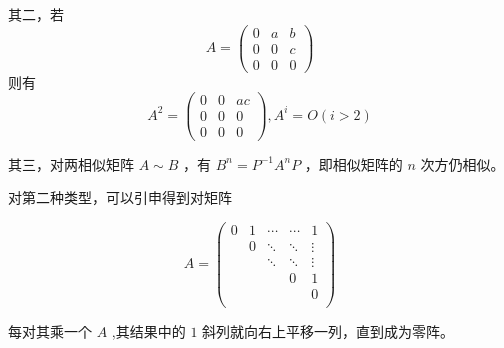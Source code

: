 其二，若$$
    A = \begin{pmatrix}
        0&a&b\\ 
        0&0&c\\ 
        0&0&0
    \end{pmatrix}
$$ 
则有$$
    A^2 = \begin{pmatrix}
        0&0&ac\\ 
        0&0&0\\ 
        0&0&0
    \end{pmatrix},
    A^i = O (i > 2)
$$ 

其三，对两相似矩阵 $ A\sim B $ ，有
$ B^n = P^{-1}A^nP $ ，即相似矩阵的 $ n $ 次方仍相似。

对第二种类型，可以引申得到对矩阵

$$
    A=\begin{pmatrix}
        0&1&\cdots&\cdots&1\\ 
        &0&\ddots&\ddots&\vdots\\ 
        &&\ddots&\ddots&\vdots\\ 
        &&&0&1\\ 
        &&&&0\\ 
    \end{pmatrix}
$$ 

每对其乘一个 $ A $ ,其结果中的 $ 1 $ 斜列就向右上平移一列，直到成为零阵。


